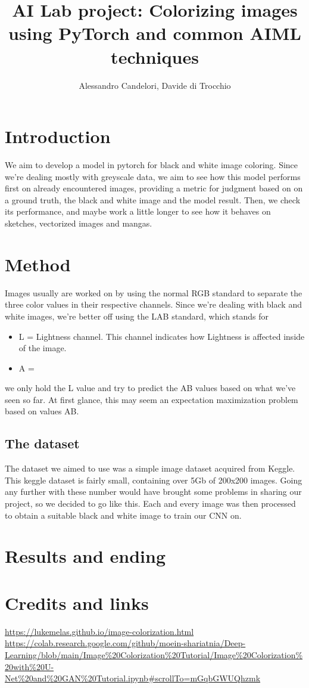 \documentclass{article}
\title{AI Lab project: Colorizing images using PyTorch and common AIML techniques  }
\author{Alessandro Candelori, Davide di Trocchio}
\begin{document}
\maketitle
\newpage
\tableofcontents
\newpage


\section{Introduction}
We aim to develop a model in pytorch for black and white image coloring. Since we're dealing mostly 
with greyscale data, we aim to see how this model performs first on already encountered images, 
providing a metric for judgment based on on a ground truth, the black and white image and the model result. 
Then, we check its performance, and maybe work a little longer to see how it behaves on sketches, 
vectorized images and mangas. 

\section{Method}
Images usually are worked on by using the normal RGB standard to separate the three color values in 
their respective channels. Since we're dealing with black and white images, we're better off using the 
LAB standard, which stands for \begin{itemize}
    \item L = Lightness channel. This channel indicates how Lightness is affected inside 
            of the image. 
    \item A = 

\end{itemize}

we only hold the L value and try to predict the AB values 
based on what we've seen so far. At first glance, this may seem an expectation maximization problem
based on values AB.  

\subsection{The dataset}
The dataset we aimed to use was a simple image dataset acquired from Keggle. This keggle dataset 
is fairly small, containing over 5Gb of 200x200 images. Going any further with these number 
would have brought some problems in sharing our project, so we decided to go like this. 
Each and every image was then processed to obtain a suitable black and white image to train our 
CNN on.  

\section{Results and ending}


\section{Credits and links}
\url{https://lukemelas.github.io/image-colorization.html} \\ 
\url{https://colab.research.google.com/github/moein-shariatnia/Deep-Learning/blob/main/Image%20Colorization%20Tutorial/Image%20Colorization%20with%20U-Net%20and%20GAN%20Tutorial.ipynb#scrollTo=mGqbGWUQhzmk}
\end{document}
